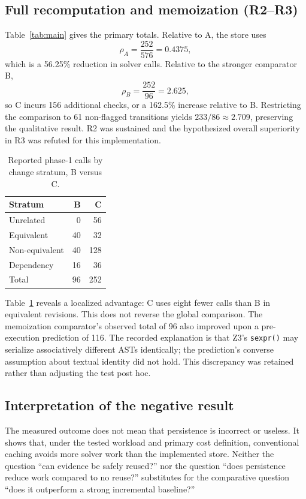 \documentclass[10pt,twocolumn]{article}
\begin{document}
\subsection{Full recomputation and memoization (R2--R3)}
Table~\ref{tab:main} gives the primary totals. Relative to A, the store uses
\begin{equation}\label{eq:r2}
\rho_A=\frac{252}{576}=0.4375,
\end{equation}
which is a 56.25\% reduction in solver calls. Relative to the stronger comparator B,
\begin{equation}\label{eq:r3}
\rho_B=\frac{252}{96}=2.625,
\end{equation}
so C incurs 156 additional checks, or a 162.5\% increase relative to B. Restricting the comparison to 61 non-flagged transitions yields $233/86\approx2.709$, preserving the qualitative result. R2 was sustained and the hypothesized overall superiority in R3 was refuted for this implementation.

\begin{table}[t]
\centering\caption{Reported phase-1 calls by change stratum, B versus C.}\label{tab:strata}
\begin{tabular}{lrr}\toprule
Stratum & B & C\\\midrule
Unrelated & 0 & 56\\
Equivalent & 40 & 32\\
Non-equivalent & 40 & 128\\
Dependency & 16 & 36\\\midrule
Total & 96 & 252\\\bottomrule\end{tabular}
\end{table}

Table~\ref{tab:strata} reveals a localized advantage: C uses eight fewer calls than B in equivalent revisions. This does not reverse the global comparison. The memoization comparator's observed total of 96 also improved upon a pre-execution prediction of 116. The recorded explanation is that Z3's \texttt{sexpr()} may serialize associatively different ASTs identically; the prediction's converse assumption about textual identity did not hold. This discrepancy was retained rather than adjusting the test post hoc.

\subsection{Interpretation of the negative result}
The measured outcome does not mean that persistence is incorrect or useless. It shows that, under the tested workload and primary cost definition, conventional caching avoids more solver work than the implemented store. Neither the question ``can evidence be safely reused?'' nor the question ``does persistence reduce work compared to no reuse?'' substitutes for the comparative question ``does it outperform a strong incremental baseline?''
\end{document}
